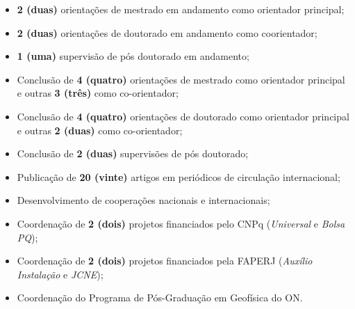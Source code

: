 \begin{itemize}
	\item[\parbox{0.03\textwidth}{\vspace{-0.1\baselineskip}\faHandHoldingWater}]
	\textbf{2 (duas)} orientações de mestrado em andamento como orientador principal;
	\item[\parbox{0.03\textwidth}{\vspace{-0.1\baselineskip}\faHandsHelping}]
	\textbf{2 (duas)} orientações de doutorado em andamento como coorientador;
	\item[\parbox{0.03\textwidth}{\vspace{-0.1\baselineskip}\faHandshake}]
	\textbf{1 (uma)} supervisão de pós doutorado em andamento;
	\item[\parbox{0.03\textwidth}{\vspace{-0.1\baselineskip}\faGraduationCap}]
	Conclusão de \textbf{4 (quatro)} orientações de mestrado como orientador principal e outras \textbf{3 (três)} como co-orientador;
	\item[\parbox{0.03\textwidth}{\vspace{-0.1\baselineskip}\faGraduationCap}]
	Conclusão de \textbf{4 (quatro)} orientações de doutorado como orientador principal e outras \textbf{2 (duas)} como co-orientador;
	\item[\parbox{0.025\textwidth}{\vspace{-0.1\baselineskip}\faGlasses}]
	Conclusão de \textbf{2 (duas)} supervisões de pós doutorado;
	\item[\parbox{0.03\textwidth}{\vspace{-0.1\baselineskip}\faPencil*}]
	Publicação de \textbf{20 (vinte)} artigos em periódicos de circulação internacional;
	\item[\parbox{0.03\textwidth}{\vspace{-0.1\baselineskip}\faPeopleCarry}]
	Desenvolvimento de cooperações nacionais e internacionais;
	\item[\parbox{0.03\textwidth}{\vspace{-0.1\baselineskip}\aiIDEASRePEc}] 
	Coordenação de \textbf{2 (dois)} projetos financiados pelo CNPq
	(\textit{Universal} e \textit{Bolsa PQ});
	\item[\parbox{0.03\textwidth}{\vspace{-0.1\baselineskip}\aiIDEASRePEc}]
	Coordenação de \textbf{2 (dois)} projetos financiados pela FAPERJ
	(\textit{Auxílio Instalação} e \textit{JCNE});
	\item[\parbox{0.03\textwidth}{\vspace{-0.1\baselineskip}\faBomb}]
	Coordenação do Programa de Pós-Graduação em Geofísica do ON.

\end{itemize}
